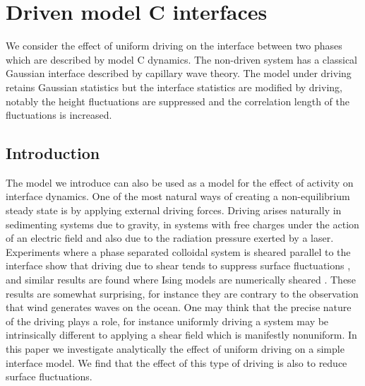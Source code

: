 \chapter{Driven model C interfaces}
We consider the effect of uniform driving on the interface between two phases which are described by model C dynamics. The non-driven system has a classical Gaussian interface described by capillary wave theory. The model under driving retains Gaussian statistics but the interface statistics are modified by driving, notably the height fluctuations are suppressed and  the correlation length of the fluctuations is increased.

    \section{Introduction}

The model we introduce can also be used as a model for the effect of activity on interface dynamics.
One of the most natural ways of creating a non-equilibrium steady state is by applying external  driving forces. Driving arises naturally in sedimenting systems due to gravity, in systems with free charges under the action of an electric field and also  due to the radiation pressure exerted by a laser. Experiments where a phase separated colloidal system is sheared parallel to the interface show that  driving due to shear tends to suppress surface fluctuations \cite{derks2006},
and similar results are found where Ising models are numerically sheared 
\cite{smith2008,smith2010}. These results are somewhat surprising, for instance they are contrary to the  observation that wind generates waves on the ocean. One may think that the precise nature of the driving plays a role, for instance uniformly driving a system may be intrinsically different to applying a shear field which is manifestly nonuniform. In this paper we investigate analytically the effect of uniform driving on a simple interface model. We find that the effect of this type of  driving is also to reduce surface fluctuations.

